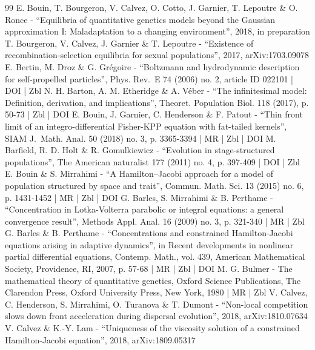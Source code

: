 \documentclass[10pt]{amsart}
\theoremstyle{plain}
\theoremstyle{definition}
\begin{document}
\begin{thebibliography}{99}
E. Bouin, T. Bourgeron, V. Calvez, O. Cotto, J. Garnier, T. Lepoutre \& O. Ronce - “Equilibria of quantitative genetics models beyond the Gaussian approximation I: Maladaptation to a changing environment”, 2018, in preparation
T. Bourgeron, V. Calvez, J. Garnier \& T. Lepoutre - “Existence of recombination-selection equilibria for sexual populations”, 2017, arXiv:1703.09078
E. Bertin, M. Droz \& G. Grégoire - “Boltzmann and hydrodynamic description for self-propelled particles”, Phys. Rev. E 74 (2006) no. 2, article ID 022101 | DOI | Zbl
N. H. Barton, A. M. Etheridge \& A. Véber - “The infinitesimal model: Definition, derivation, and implications”, Theoret. Population Biol. 118 (2017), p. 50-73 | Zbl | DOI
E. Bouin, J. Garnier, C. Henderson \& F. Patout - “Thin front limit of an integro-differential Fisher-KPP equation with fat-tailed kernels”, SIAM J. Math. Anal. 50 (2018) no. 3, p. 3365-3394 | MR | Zbl | DOI
M. Barfield, R. D. Holt \& R. Gomulkiewicz - “Evolution in stage-structured populations”, The American naturalist 177 (2011) no. 4, p. 397-409 | DOI | Zbl
E. Bouin \& S. Mirrahimi - “A Hamilton–Jacobi approach for a model of population structured by space and trait”, Commun. Math. Sci. 13 (2015) no. 6, p. 1431-1452 | MR | Zbl | DOI
G. Barles, S. Mirrahimi \& B. Perthame - “Concentration in Lotka-Volterra parabolic or integral equations: a general convergence result”, Methods Appl. Anal. 16 (2009) no. 3, p. 321-340 | MR | Zbl
G. Barles \& B. Perthame - “Concentrations and constrained Hamilton-Jacobi equations arising in adaptive dynamics”, in Recent developments in nonlinear partial differential equations, Contemp. Math., vol. 439, American Mathematical Society, Providence, RI, 2007, p. 57-68 | MR | Zbl | DOI
M. G. Bulmer - The mathematical theory of quantitative genetics, Oxford Science Publications, The Clarendon Press, Oxford University Press, New York, 1980 | MR | Zbl
V. Calvez, C. Henderson, S. Mirrahimi, O. Turanova \& T. Dumont - “Non-local competition slows down front acceleration during dispersal evolution”, 2018, arXiv:1810.07634
V. Calvez \& K.-Y. Lam - “Uniqueness of the viscosity solution of a constrained Hamilton-Jacobi equation”, 2018, arXiv:1809.05317

\end{thebibliography}
\end{document}
